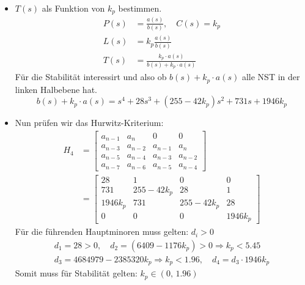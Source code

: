     \begin{itemize}
        \item $T(s)$ als Funktion von $k_p$ bestimmen.
            \begin{align*}
                P(s) &= \frac{a(s)}{b(s)},\quad C(s) = k_p\\
                L(s) &=  k_p\frac{a(s)}{b(s)}\\
                T(s) &=  \frac{k_p\cdot a(s)}{b(s) + k_p\cdot a(s)}
            \end{align*}
            Für die Stabilität interessirt und also ob $b(s) + k_p\cdot a(s)$ alle NST in der linken Halbebene hat.
            \begin{equation*}
                b(s) + k_p\cdot a(s) = s^4 + 28s^3 + (255-42k_p)s^2 + 731s + 1946k_p
            \end{equation*}
        
        \item Nun prüfen wir das Hurwitz-Kriterium:
            \begin{align*}
                H_4 &= 
                \begin{bmatrix}
                a_{n-1} & a_n & 0 & 0\\
                a_{n-3} & a_{n-2} & a_{n-1} & a_n\\
                a_{n-5} & a_{n-4} & a_{n-3} & a_{n-2}\\
                a_{n-7} & a_{n-6} & a_{n-5} & a_{n-4}
                \end{bmatrix}\\
                &= 
                \begin{bmatrix}
                28 & 1 & 0 & 0\\
                731 & 255-42k_p & 28 & 1\\
                1946k_p &731 & 255-42k_p & 28\\
                0   &   0   &   0   &   1946k_p
                \end{bmatrix}
            \end{align*}
            Für die führenden Hauptminoren muss gelten: $d_i > 0$
            \begin{gather*}
                d_1 = 28 > 0,\quad  d_2 = (6409-1176k_p) > 0 \Rightarrow k_p < 5.45\\
                d_3 = 4684979-2385320k_p \Rightarrow k_p < 1.96,\quad d_4 = d_3\cdot1946k_p 
            \end{gather*}
            Somit muss für Stabilität gelten: $k_p\in(0,\,1.96)$
    \end{itemize}